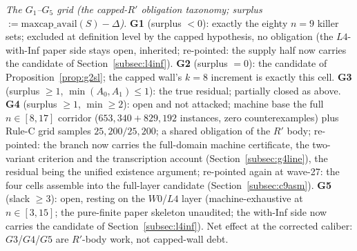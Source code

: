 \emph{The $G_1$--$G_5$ grid (the capped-$R'$ obligation taxonomy; surplus
$:=\mathrm{maxcap\_avail}(S)-\Delta$).} \textbf{G1} (surplus $<0$): exactly the eighty $n=9$
killer sets; excluded at definition level by the capped hypothesis, no obligation (the
$L4$-with-Inf paper side stays open, inherited; re-pointed: the supply half now carries
the candidate of Section~\ref{subsec:l4inf}). \textbf{G2} (surplus $=0$): the candidate
of Proposition~\ref{prop:g2sl}; the capped wall's $k=8$ increment is exactly this cell.
\textbf{G3} (surplus $\ge1$, $\min(A_0,A_1)\le1$): the true residual; partially closed as
above. \textbf{G4} (surplus $\ge1$, $\min\ge2$): open and not attacked; machine base the
full $n\in[8,17]$ corridor ($653{,}340+829{,}192$ instances, zero counterexamples) plus
Rule-C grid samples $25{,}200/25{,}200$; a shared obligation of the $R'$ body;
re-pointed: the branch now carries the full-domain machine certificate, the
two-variant criterion and the transcription account (Section~\ref{subsec:g4line}),
the residual being the unified existence argument; re-pointed again at
wave-27: the four cells assemble into the full-layer candidate
(Section~\ref{subsec:c9asm}).
\textbf{G5} (slack $\ge3$): open, resting on the $W0$/$L4$ layer (machine-exhaustive at
$n\in[3,15]$; the pure-finite paper skeleton unaudited; the with-Inf side now carries
the candidate of Section~\ref{subsec:l4inf}). Net effect
at the corrected caliber: $G3$/$G4$/$G5$ are $R'$-body work, not capped-wall debt.

